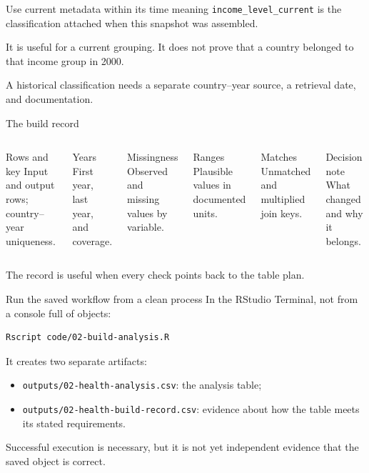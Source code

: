 \begin{frame}{Use current metadata within its time meaning}
  \texttt{income\_level\_current} is the classification attached when this
  snapshot was assembled.

  \vspace{0.6em}
  It is useful for a current grouping. It does \alert{not} prove that a country
  belonged to that income group in 2000.

  \vspace{0.6em}
  A historical classification needs a separate country--year source, a retrieval
  date, and documentation.
\end{frame}

\begin{frame}{The build record}
  \begin{columns}[T,onlytextwidth]
      \begin{block}{Rows and key}
        Input and output rows; country--year uniqueness.
      \end{block}
      \begin{block}{Years}
        First year, last year, and coverage.
      \end{block}
      \begin{block}{Missingness}
        Observed and missing values by variable.
      \end{block}
      \begin{block}{Ranges}
        Plausible values in documented units.
      \end{block}
      \begin{block}{Matches}
        Unmatched and multiplied join keys.
      \end{block}
      \begin{block}{Decision note}
        What changed and why it belongs.
      \end{block}
  \end{columns}

  \vfill
  The record is useful when every check points back to the table plan.
\end{frame}

\begin{frame}[fragile]{Run the saved workflow from a clean process}
  In the RStudio Terminal, not from a console full of objects:

\begin{lstlisting}
Rscript code/02-build-analysis.R
\end{lstlisting}

  It creates two separate artifacts:
  \begin{itemize}
    \item \texttt{outputs/02-health-analysis.csv}: the analysis table;
    \item \texttt{outputs/02-health-build-record.csv}: evidence about how the
      table meets its stated requirements.
  \end{itemize}

  \vfill
  Successful execution is necessary, but it is not yet independent evidence
  that the saved object is correct.
\end{frame}

